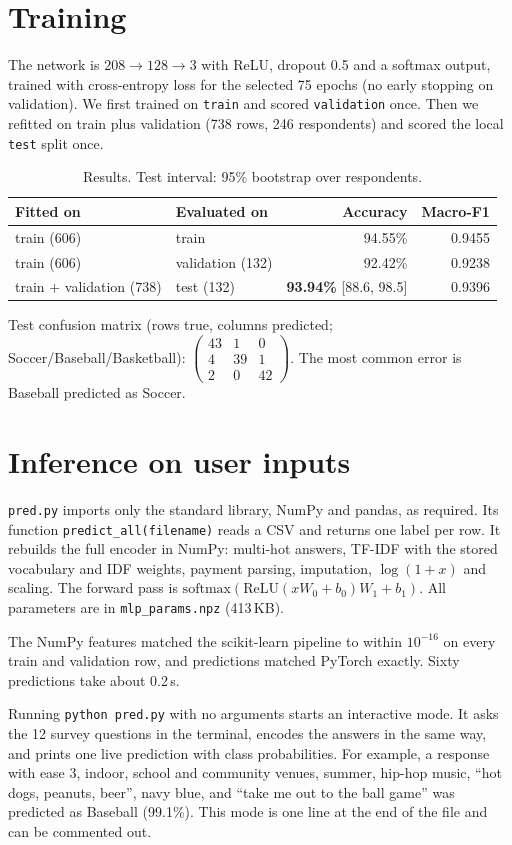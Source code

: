 \documentclass[10pt,letterpaper]{article}
\begin{document}
\section{Training}
The network is $208 \rightarrow 128 \rightarrow 3$ with ReLU, dropout 0.5 and a softmax
output, trained with cross-entropy loss for the selected 75 epochs (no early stopping
on validation). We first trained on \texttt{train} and scored \texttt{validation} once.
Then we refitted on train plus validation (738 rows, 246 respondents) and scored the
local \texttt{test} split once.

\begin{table}[ht]
\centering\small
\caption{Results. Test interval: 95\% bootstrap over respondents.}
\begin{tabular}{llrr}
\toprule
Fitted on & Evaluated on & Accuracy & Macro-F1\\
\midrule
train (606) & train & 94.55\% & 0.9455\\
train (606) & validation (132) & 92.42\% & 0.9238\\
train + validation (738) & test (132) & \textbf{93.94\%} [88.6, 98.5] & 0.9396\\
\bottomrule
\end{tabular}
\end{table}

Test confusion matrix (rows true, columns predicted; Soccer/Baseball/Basketball):
$\left(\begin{smallmatrix}43&1&0\\4&39&1\\2&0&42\end{smallmatrix}\right)$.
The most common error is Baseball predicted as Soccer.

\section{Inference on user inputs}
\texttt{pred.py} imports only the standard library, NumPy and pandas, as required.
Its function \texttt{predict\_all(filename)} reads a CSV and returns one label per row.
It rebuilds the full encoder in NumPy: multi-hot answers, TF-IDF with the stored
vocabulary and IDF weights, payment parsing, imputation, $\log(1+x)$ and scaling.
The forward pass is $\mathrm{softmax}(\mathrm{ReLU}(xW_0+b_0)W_1+b_1)$. All parameters
are in \texttt{mlp\_params.npz} (413\,KB).

The NumPy features matched the scikit-learn pipeline to within $10^{-16}$ on every
train and validation row, and predictions matched PyTorch exactly. Sixty predictions
take about 0.2\,s.

Running \texttt{python pred.py} with no arguments starts an interactive mode. It asks the
12 survey questions in the terminal, encodes the answers in the same way, and prints
one live prediction with class probabilities. For example, a response with ease 3,
indoor, school and community venues, summer, hip-hop music, ``hot dogs, peanuts, beer'', navy
blue, and ``take me out to the ball game'' was predicted as Baseball (99.1\%). This mode
is one line at the end of the file and can be commented out.
\end{document}

